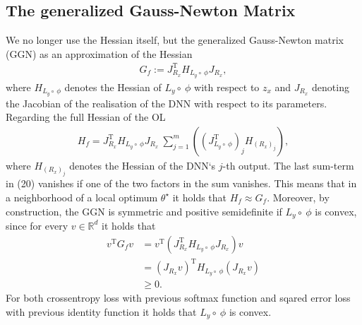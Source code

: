 \documentclass[conference]{IEEEtran}
\begin{document}
\subsection{The generalized Gauss-Newton Matrix}
\noindent
We no longer use the Hessian itself, but the generalized Gauss-Newton matrix (GGN) as an approximation of the Hessian
\begin{align}
G_{f} := J_{R_{x}}^{\mathrm{T}}H_{L_{y}\circ\:\phi}J_{R_{x}},
\end{align}
where $H_{L_{y}\circ\:\phi}$ denotes the Hessian of $L_{y}\circ\:\phi$ with respect to $z_{x}$ and $J_{R_{x}}$ denoting the Jacobian of the realisation of the DNN with respect to its parameters.
Regarding the full Hessian of the OL
\begin{align}
H_{f} = J_{R_{x}}^{\mathrm{T}}H_{L_{y}\circ\:\phi}J_{R_{x}}\:\sum_{j = 1}^{m}\left(\left(J_{L_{y}\circ \:\phi}^{\mathrm{T}}\right)_{j} H_{(R_{x})_{j}}\right),
\end{align}
where $H_{(R_{x})_{j}}$ denotes the Hessian of the DNN`s  $j$-th output. The last sum-term in (20) vanishes if one of the two factors in the sum vanishes.
This means that in a neighborhood of a local optimum $\theta^{\star}$ it holds that $H_{f} \approx G_{f}$.   Moreover, by construction, the GGN is symmetric and positive semidefinite if $L_{y}\circ\:\phi$ is convex, since for every $v\in\mathbb{R}^{d}$ it holds that
\begin{align}
v^{\mathrm{T}}G_{f}v &= v^{\mathrm{T}}\left( J_{R_{x}}^{\mathrm{T}}H_{L_{y}\circ\:\phi}J_{R_{x}}\right)v\\
&= \left(J_{R_{x}}v\right)^{\mathrm{T}}H_{L_{y}\circ\:\phi}\left(J_{R_{x}}v\right) \\
&\geq 0.
\end{align}
For both crossentropy loss with previous softmax function and sqared error loss with previous identity function it holds that $L_{y}\circ\:\phi$ is convex.
\end{document}
